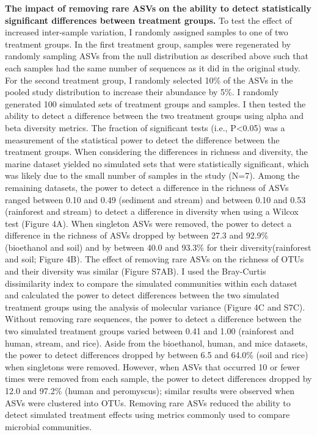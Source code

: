 \documentclass[
]{article}
\begin{document}
\textbf{The impact of removing rare ASVs on the ability to detect
statistically significant differences between treatment groups.} To test
the effect of increased inter-sample variation, I randomly assigned
samples to one of two treatment groups. In the first treatment group,
samples were regenerated by randomly sampling ASVs from the null
distribution as described above such that each samples had the same
number of sequences as it did in the original study. For the second
treatment group, I randomly selected 10\% of the ASVs in the pooled
study distribution to increase their abundance by 5\%. I randomly
generated 100 simulated sets of treatment groups and samples. I then
tested the ability to detect a difference between the two treatment
groups using alpha and beta diversity metrics. The fraction of
significant tests (i.e., P\textless0.05) was a measurement of the
statistical power to detect the difference between the treatment groups.
When considering the differences in richness and diversity, the marine
dataset yielded no simulated sets that were statistically significant,
which was likely due to the small number of samples in the study (N=7).
Among the remaining datasets, the power to detect a difference in the
richness of ASVs ranged between 0.10 and 0.49 (sediment and stream) and
between 0.10 and 0.53 (rainforest and stream) to detect a difference in
diversity when using a Wilcox test (Figure 4A). When singleton ASVs were
removed, the power to detect a difference in the richness of ASVs
dropped by between 27.3 and 92.9\% (bioethanol and soil) and by between
40.0 and 93.3\% for their diversity(rainforest and soil; Figure 4B). The
effect of removing rare ASVs on the richness of OTUs and their diversity
was similar (Figure S7AB). I used the Bray-Curtis dissimilarity index to
compare the simulated communities within each dataset and calculated the
power to detect differences between the two simulated treatment groups
using the analysis of molecular variance (Figure 4C and S7C). Without
removing rare sequences, the power to detect a difference between the
two simulated treatment groups varied between 0.41 and 1.00 (rainforest
and human, stream, and rice). Aside from the bioethanol, human, and mice
datasets, the power to detect differences dropped by between 6.5 and
64.0\% (soil and rice) when singletons were removed. However, when ASVs
that occurred 10 or fewer times were removed from each sample, the power
to detect differences dropped by 12.0 and 97.2\% (human and peromyscus);
similar results were observed when ASVs were clustered into OTUs.
Removing rare ASVs reduced the ability to detect simulated treatment
effects using metrics commonly used to compare microbial communities.
\end{document}
